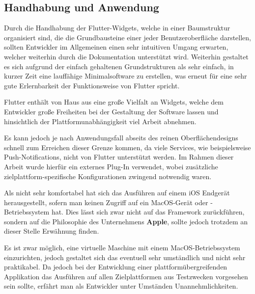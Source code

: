 \documentclass[bibliography=totoc,listof=totoc,BCOR=5mm,DIV=12,oneside]{scrbook}
\begin{document}
\subsection{Handhabung und Anwendung}
\label{sub:handhabungFLutter}
\par Durch die Handhabung der Flutter-Widgets, welche in einer Baumstruktur organisiert sind, die die Grundbausteine einer jeder Benutzeroberfläche darstellen, sollten Entwickler im Allgemeinen einen sehr intuitiven Umgang erwarten, welcher weiterhin durch die Dokumentation unterstützt wird. Weiterhin gestaltet es sich aufgrund der einfach gehaltenen Grundstrukturen als sehr einfach, in kurzer Zeit eine lauffähige Minimalsoftware zu erstellen, was erneut für eine sehr gute Erlernbarkeit der Funktionsweise von Flutter spricht.

\par \bigskip Flutter enthält von Haus aus eine große Vielfalt an Widgets, welche dem Entwickler große Freiheiten bei der Gestaltung der Software lassen und  hinsichtlich der Plattformunabhängigkeit viel Arbeit abnehmen.

\par \bigskip Es kann jedoch je nach Anwendungsfall abseits des reinen Oberflächendesigns schnell zum Erreichen dieser Grenze kommen, da viele Services, wie beispielsweise Push-Notifications, nicht von Flutter unterstützt werden. Im Rahmen dieser Arbeit wurde hierfür ein externes Plug-In verwendet, wobei zusätzliche zielplattform-spezifische Konfigurationen zwingend notwendig waren.

\par \bigskip Als nicht sehr komfortabel hat sich das Ausführen auf einem iOS Endgerät herausgestellt, sofern man keinen Zugriff auf ein MacOS-Gerät oder -Betriebssystem hat. Dies lässt sich zwar nicht auf das Framework zurückführen, sondern auf die Philosophie des Unternehmens \textbf{Apple}, sollte jedoch trotzdem an dieser Stelle Erwähnung finden. 
\par \bigskip Es ist zwar möglich, eine virtuelle Maschine mit einem MacOS-Betriebssystem einzurichten, jedoch gestaltet sich das eventuell sehr umständlich und nicht sehr praktikabel. Da jedoch bei der Entwicklung einer plattformübergreifenden Applikation das Ausführen auf allen Zielplattformen aus Testzwecken vorgesehen sein sollte, erfährt man als Entwickler unter Umständen Unannehmlichkeiten.
\end{document}

